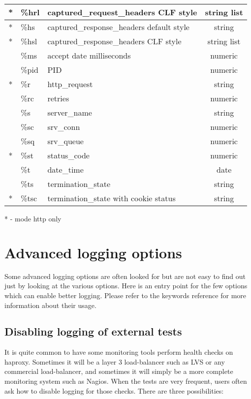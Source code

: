 \begin{tabular}{|c|l|l|c|}
\hline
{*} & \%hrl & captured\_request\_headers CLF style & string list \\
\hline
{*} & \%hs & captured\_response\_headers default style & string \\
\hline
{*} & \%hsl & captured\_response\_headers CLF style & string list \\
\hline
{} & \%ms & accept date milliseconds & numeric \\
\hline
{} & \%pid & PID & numeric \\
\hline
{*} & \%r & http\_request & string \\
\hline
{} & \%rc & retries & numeric \\
\hline
{} & \%s & server\_name & string \\
\hline
{} & \%sc & srv\_conn & numeric \\
\hline
{} & \%sq & srv\_queue & numeric \\
\hline
{*} & \%st & status\_code & numeric \\
\hline
{} & \%t & date\_time & date \\
\hline
{} & \%ts & termination\_state & string \\
\hline
{*} & \%tsc & termination\_state with cookie status & string \\
\hline
\end{tabular}

* - mode http only

\section{Advanced logging options}
\label{sec:advanced_logging}

Some advanced logging options are often looked for but are not easy to find out
just by looking at the various options. Here is an entry point for the few
options which can enable better logging. Please refer to the keywords reference
for more information about their usage.

\subsection{Disabling logging of external tests}
\label{subsec:disabling_logging_external_tests}

It is quite common to have some monitoring tools perform health checks on
haproxy. Sometimes it will be a layer 3 load-balancer such as LVS or any
commercial load-balancer, and sometimes it will simply be a more complete
monitoring system such as Nagios. When the tests are very frequent, users often
ask how to disable logging for those checks. There are three possibilities:

